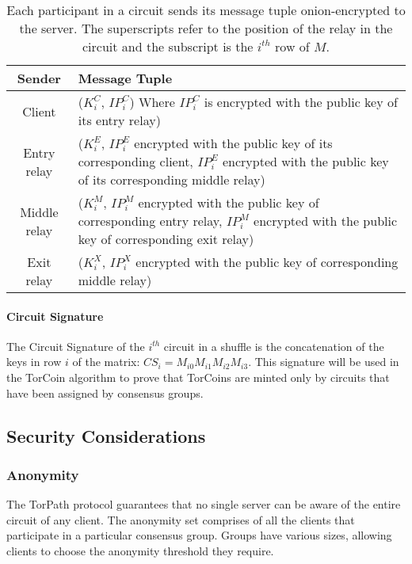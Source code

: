 {\renewcommand{\arraystretch}{2}
\begin{table}[h]
\centering
  \begin{tabular}{ |c || p{9cm}| }
  \hline
  \textbf{Sender} & \textbf{Message Tuple} \\ \hline
  Client & ($K_{i}^{C}$, $IP_{i}^{C}$)
  Where $IP_{i}^{C}$ is encrypted with the public key of its 
  entry relay) \\ \hline
  Entry relay & ($K_{i}^{E}$, {$IP_{i}^{E}$ encrypted with the public key of 
  its corresponding client}, {$IP_{i}^{E}$ encrypted with the public key of 
  its corresponding middle relay}) \\ \hline
  Middle relay & ($K_{i}^{M}$, {$IP_{i}^{M}$ encrypted with the public key of 
  corresponding entry relay}, {$IP_{i}^{M}$ encrypted with the public key of 
  corresponding exit relay}) \\ \hline
  Exit relay & ($K_{i}^{X}$, {$IP_{i}^{X}$ encrypted with the public key of 
  corresponding middle relay}) \\ \hline
  \end{tabular}
  \caption{Each participant in a circuit sends its message 
  tuple onion-encrypted to the server. The superscripts refer to the position 
  of the relay in the circuit and the subscript is the $i^{th}$ row of $M$.}
  \label{table:message_format}
\end{table}


\paragraph{Circuit Signature} The Circuit Signature of the $i^{th}$ circuit in
a shuffle is the concatenation of the keys in row $i$ of the matrix: $CS_i =
M_{i0}M_{i1}M_{i2}M_{i3}$. This signature will be used in the TorCoin algorithm
to prove that TorCoins are minted only by circuits that have been assigned by
consensus groups.

\subsection{Security Considerations} 

\subsubsection{Anonymity} The TorPath protocol guarantees that no single
server can be aware of the entire circuit of any client. The anonymity set
comprises of all the clients that participate in a particular consensus group.
Groups have various sizes, allowing clients to choose the anonymity threshold
they require.

}
